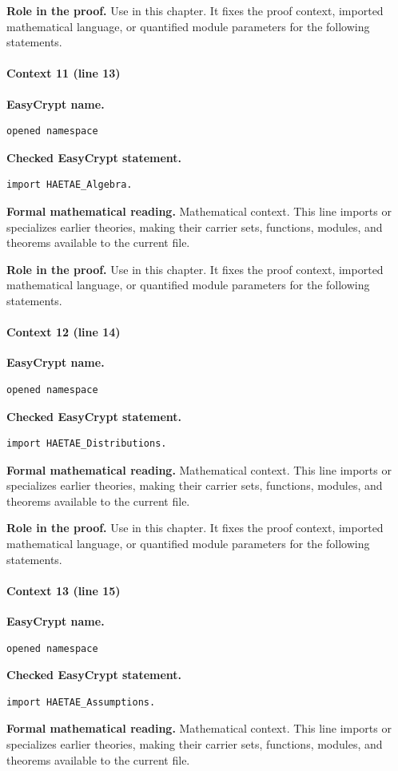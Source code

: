 \noindent\textbf{Role in the proof.}
Use in this chapter. It fixes the proof context, imported mathematical language, or quantified module parameters for the following statements.

\paragraph{Context 11 (line 13)}
\noindent\textbf{EasyCrypt name.}
\begin{lstlisting}[language=EasyCrypt,basicstyle=\ttfamily\scriptsize]
opened namespace
\end{lstlisting}
\noindent\textbf{Checked EasyCrypt statement.}
\begin{lstlisting}[language=EasyCrypt,basicstyle=\ttfamily\scriptsize]
import HAETAE_Algebra.
\end{lstlisting}
\noindent\textbf{Formal mathematical reading.}
Mathematical context. This line imports or specializes earlier theories, making their carrier sets, functions, modules, and theorems available to the current file.

\noindent\textbf{Role in the proof.}
Use in this chapter. It fixes the proof context, imported mathematical language, or quantified module parameters for the following statements.

\paragraph{Context 12 (line 14)}
\noindent\textbf{EasyCrypt name.}
\begin{lstlisting}[language=EasyCrypt,basicstyle=\ttfamily\scriptsize]
opened namespace
\end{lstlisting}
\noindent\textbf{Checked EasyCrypt statement.}
\begin{lstlisting}[language=EasyCrypt,basicstyle=\ttfamily\scriptsize]
import HAETAE_Distributions.
\end{lstlisting}
\noindent\textbf{Formal mathematical reading.}
Mathematical context. This line imports or specializes earlier theories, making their carrier sets, functions, modules, and theorems available to the current file.

\noindent\textbf{Role in the proof.}
Use in this chapter. It fixes the proof context, imported mathematical language, or quantified module parameters for the following statements.

\paragraph{Context 13 (line 15)}
\noindent\textbf{EasyCrypt name.}
\begin{lstlisting}[language=EasyCrypt,basicstyle=\ttfamily\scriptsize]
opened namespace
\end{lstlisting}
\noindent\textbf{Checked EasyCrypt statement.}
\begin{lstlisting}[language=EasyCrypt,basicstyle=\ttfamily\scriptsize]
import HAETAE_Assumptions.
\end{lstlisting}
\noindent\textbf{Formal mathematical reading.}
Mathematical context. This line imports or specializes earlier theories, making their carrier sets, functions, modules, and theorems available to the current file.

